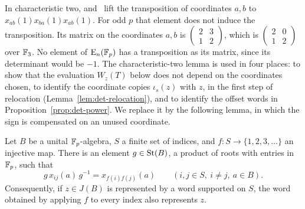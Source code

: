 In characteristic two, \cite[Lemma~6.3]{OAI247periodic} and~\cite[Lemma~3.3]{OAI247rf} lift the transposition of
coordinates $a,b$ to $x_{ab}(1)x_{ba}(1)x_{ab}(1)$. For odd $p$ that element does not induce the transposition. Its
matrix on the coordinates $a,b$ is $\left(\begin{smallmatrix}2&3\\1&2\end{smallmatrix}\right)$, which is
$\left(\begin{smallmatrix}2&0\\1&2\end{smallmatrix}\right)$ over $\mathbb F_3$. No element of $\operatorname{E}_n(\mathbb F_p)$ has a transposition
as its matrix, since its determinant would be $-1$. The characteristic-two lemma is used in four places: to show that the
evaluation $W_z(T)$ below does not depend on the coordinates chosen, to identify the coordinate copies $\iota_s(z)$ with
$z$, in the first step of relocation (Lemma~\ref{lem:det-relocation}), and to identify the offset words in
Proposition~\ref{prop:det-power}. We replace it by the following lemma, in which the sign is compensated on an unused
coordinate.

\begin{lemma}\label{lem:tor-relabel}
Let $B$ be a unital $\mathbb F_p$-algebra, $S$ a finite set of indices, and $f\colon S\to\{1,2,3,\dots\}$ an injective map.
There is an element $g\in\operatorname{St}(B)$, a product of roots with entries in $\mathbb F_p$, such that
\[
 g\,x_{ij}(a)\,g^{-1}=x_{f(i)f(j)}(a)\qquad(i,j\in S,\ i\neq j,\ a\in B).
\]
Consequently, if $z\in J(B)$ is represented by a word supported on $S$, the word obtained by applying $f$ to every index
also represents $z$.
\end{lemma}

